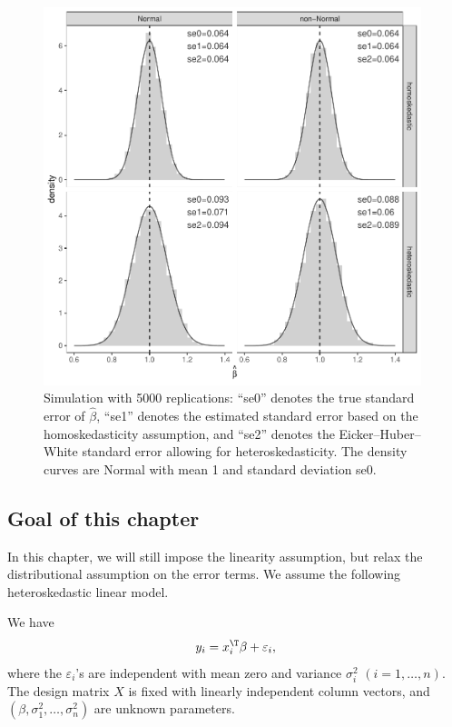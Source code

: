 \begin{figure}[t]
\centering
\includegraphics[width=0.98\textwidth]{figures/asymptoticinference_ggplot.pdf}
\caption{Simulation with 5000 replications: ``se0'' denotes the true standard error of $\hat{\beta}$, ``se1'' denotes the estimated standard error based on the homoskedasticity assumption, and ``se2'' denotes the Eicker--Huber--White standard error allowing for heteroskedasticity. The density curves are Normal with mean 1 and standard deviation se0.}
\label{fig::simulation-nonnormal-heteroskedasticity}
\end{figure}



\subsection{Goal of this chapter}

In this chapter, we will still impose the linearity assumption, but
relax the distributional assumption on the error terms. We assume the following heteroskedastic linear model.


\begin{assumption}
\label{assume::heteroskedasticity-lm}
We have
\[
y_{i}=x_{i}^{\T}\beta+\varepsilon_{i},
\]
where the $\varepsilon_{i}$'s are independent
with mean zero and variance $\sigma_{i}^{2}$ $(i=1,\ldots,n)$.
The design matrix $X$ is fixed with linearly independent column vectors, and $(\beta,\sigma^{2}_1, \ldots, \sigma^2_n)$
are unknown parameters. 
\end{assumption}


